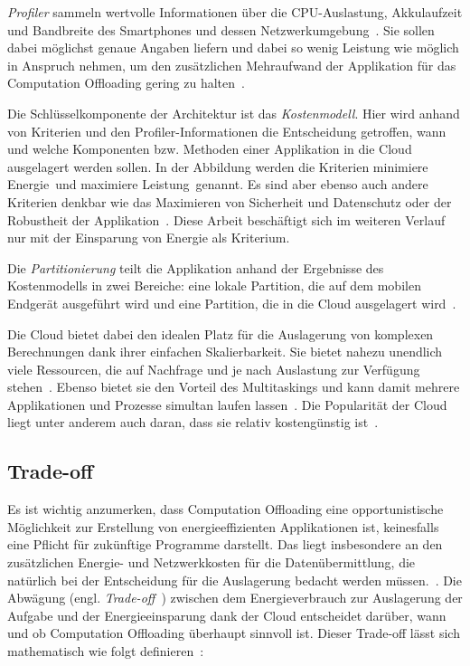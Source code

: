 \documentclass{sigchi}
\begin{document}
\emph{Profiler} sammeln wertvolle Informationen über die CPU-Auslastung, Akkulaufzeit und Bandbreite des Smartphones und dessen Netzwerkumgebung~\cite{O13}.
Sie sollen dabei möglichst genaue Angaben liefern und dabei so wenig Leistung wie möglich in Anspruch nehmen, um den zusätzlichen Mehraufwand der Applikation für das Computation Offloading gering zu halten~\cite{thinkair}.

Die Schlüsselkomponente der Architektur ist das \emph{Kostenmodell}.
Hier wird anhand von Kriterien und den Profiler-Informationen die Entscheidung getroffen, wann und welche Komponenten bzw. Methoden einer Applikation in die Cloud ausgelagert werden sollen.
In der Abbildung werden die Kriterien \glqq minimiere Energie\grqq\ und \glqq maximiere Leistung\grqq\ genannt.
Es sind aber ebenso auch andere Kriterien denkbar wie das Maximieren von Sicherheit und Datenschutz oder der Robustheit der Applikation~\cite{O13}.
Diese Arbeit beschäftigt sich im weiteren Verlauf nur mit der Einsparung von Energie als Kriterium.

Die \emph{Partitionierung} teilt die Applikation anhand der Ergebnisse des Kostenmodells in zwei Bereiche: eine lokale Partition, die auf dem mobilen Endgerät ausgeführt wird und eine Partition, die in die Cloud ausgelagert wird~\cite{O13}.

Die Cloud bietet dabei den idealen Platz für die Auslagerung von komplexen Berechnungen dank ihrer einfachen Skalierbarkeit.
Sie bietet nahezu unendlich viele Ressourcen, die auf Nachfrage und je nach Auslastung zur Verfügung stehen~\cite{o12}.
Ebenso bietet sie den Vorteil des Multitaskings und kann damit mehrere Applikationen und Prozesse simultan laufen lassen~\cite{o4}.
Die Popularität der Cloud liegt unter anderem auch daran, dass sie relativ kostengünstig ist~\cite{O13}.

\subsection{Trade-off}

Es ist wichtig anzumerken, dass Computation Offloading eine opportunistische Möglichkeit zur Erstellung von energieeffizienten Applikationen ist, keinesfalls eine Pflicht für zukünftige Programme darstellt.
Das liegt insbesondere an den zusätzlichen Energie- und Netzwerkkosten für die Datenübermittlung, die natürlich bei der Entscheidung für die Auslagerung bedacht werden müssen.~\cite{O13, o2}.
Die Abwägung (engl. \emph{Trade-off}~\cite{o8}) zwischen dem Energieverbrauch zur Auslagerung der Aufgabe und der Energieeinsparung dank der Cloud entscheidet darüber, wann und ob Computation Offloading überhaupt sinnvoll ist.
Dieser Trade-off lässt sich mathematisch wie folgt definieren~\cite{o8}: 
\end{document}
